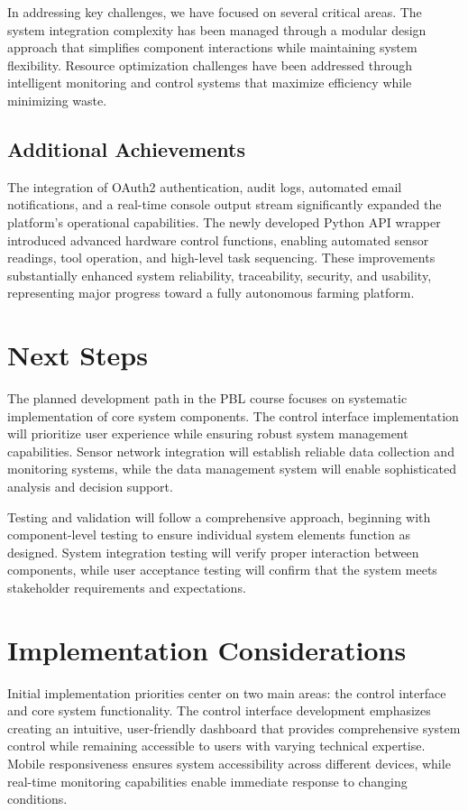 In addressing key challenges, we have focused on several critical areas. The system integration complexity has been managed through a modular design approach that simplifies component interactions while maintaining system flexibility. Resource optimization challenges have been addressed through intelligent monitoring and control systems that maximize efficiency while minimizing waste.
\subsection*{Additional Achievements}

The integration of OAuth2 authentication, audit logs, automated email notifications, and a real-time console output stream significantly expanded the platform’s operational capabilities. The newly developed Python API wrapper introduced advanced hardware control functions, enabling automated sensor readings, tool operation, and high-level task sequencing. These improvements substantially enhanced system reliability, traceability, security, and usability, representing major progress toward a fully autonomous farming platform.

\section*{Next Steps}
The planned development path in the PBL course focuses on systematic implementation of core system components. The control interface implementation will prioritize user experience while ensuring robust system management capabilities. Sensor network integration will establish reliable data collection and monitoring systems, while the data management system will enable sophisticated analysis and decision support.

Testing and validation will follow a comprehensive approach, beginning with component-level testing to ensure individual system elements function as designed. System integration testing will verify proper interaction between components, while user acceptance testing will confirm that the system meets stakeholder requirements and expectations.

\section*{Implementation Considerations}
Initial implementation priorities center on two main areas: the control interface and core system functionality. The control interface development emphasizes creating an intuitive, user-friendly dashboard that provides comprehensive system control while remaining accessible to users with varying technical expertise. Mobile responsiveness ensures system accessibility across different devices, while real-time monitoring capabilities enable immediate response to changing conditions.

